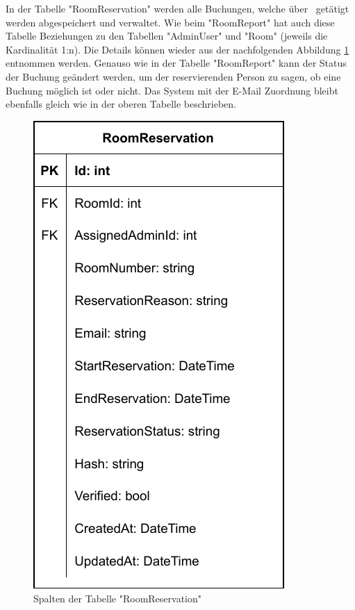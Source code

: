 
In der Tabelle "RoomReservation" werden alle Buchungen, welche über \ZELIA\ getätigt werden abgespeichert und verwaltet. Wie beim "RoomReport" hat auch diese Tabelle Beziehungen zu den Tabellen "AdminUser" und "Room" (jeweils die Kardinalität 1:n). Die Details können wieder aus der nachfolgenden Abbildung \ref{fig:RoomReservationColls} entnommen werden. Genauso wie in der Tabelle "RoomReport" kann der Status der Buchung geändert werden, um der reservierenden Person zu sagen, ob eine Buchung möglich ist oder nicht. Das System mit der E-Mail Zuordnung bleibt ebenfalls gleich wie in der oberen Tabelle beschrieben.

\begin{figure}[H]
    \centering
    \includegraphics{media/MariaDB/RoomReservation.svg.pdf}
    \caption{Spalten der Tabelle "RoomReservation"}
    \label{fig:RoomReservationColls}
\end{figure}

